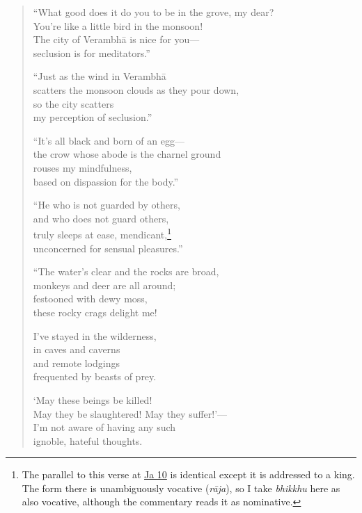 \documentclass[12pt,openany]{book}%
\begin{document}
\begin{verse}%
“What good does it do you to be in the grove, my dear? \\
You’re like a little bird in the monsoon! \\
The city of \textsanskrit{Verambhā} is nice for you—\\
seclusion is for meditators.” 

“Just as the wind in \textsanskrit{Verambhā} \\
scatters the monsoon clouds as they pour down, \\
so the city scatters \\
my perception of seclusion.” 

“It’s all black and born of an egg—\\
the crow whose abode is the charnel ground \\
rouses my mindfulness, \\
based on dispassion for the body.” 

“He who is not guarded by others, \\
and who does not guard others, \\
truly sleeps at ease, mendicant,\footnote{The parallel to this verse at \href{https://suttacentral.net/ja10/en/sujato}{Ja 10} is identical except it is addressed to a king. The form there is unambiguously vocative (\textit{\textsanskrit{rāja}}), so I take \textit{bhikkhu} here as also vocative, although the commentary reads it as nominative. } \\
unconcerned for sensual pleasures.” 

“The water’s clear and the rocks are broad, \\
monkeys and deer are all around; \\
festooned with dewy moss, \\
these rocky crags delight me! 

I’ve stayed in the wilderness, \\
in caves and caverns \\
and remote lodgings \\
frequented by beasts of prey. 

‘May these beings be killed! \\
May they be slaughtered! May they suffer!’—\\
I’m not aware of having any such \\
ignoble, hateful thoughts. 


\end{verse}
\end{document}
